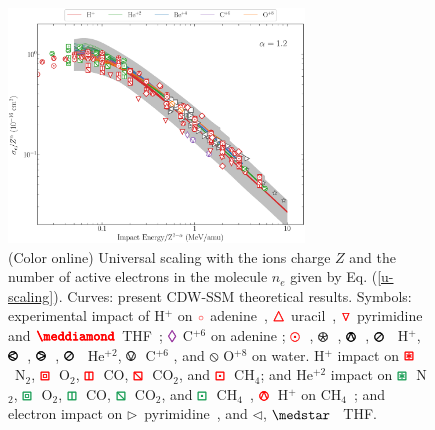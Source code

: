 \documentclass[10pt,showpacs,showkeys,twocolumn]{revtex4}
\begin{document}
\begin{figure}[!t]%
\centering
\includegraphics[width=0.7\textwidth]{zmol_werror.eps}
\caption{(Color online) Universal scaling with the ions charge $Z$ and the number of active electrons in the molecule $n_e$ given by Eq. (\ref{u-scaling}). Curves: present CDW-SSM theoretical results. 
Symbols: experimental impact of H$^+$ on 
\mbox{\LARGE$\color{red}\circ$} adenine~\cite{iriki2011}, 
{\fontsize{11}{20}$\color{red}\pmb{\triangle}$} uracil~\cite{itoh2013}, 
{\fontsize{11}{20}$\color{red}\pmb{\triangledown}$} pyrimidine~\cite{wolff2014} and 
{\fontsize{10}{20}$\color{red}\pmb{\meddiamond}$} THF~\cite{wang2016};
{\fontsize{11}{20}$\color{Purple}\pmb{\lozenge}$} C$^{+6}$ on adenine \cite{tribedi2019};
\mbox{\fontsize{11}{20}$\color{red}\pmb{\odot}$}~\cite{Luna2007}, 
{\fontsize{11}{20}\color{red}$\pmb{\logof}$}~\cite{Rudd86}, 
{\fontsize{11}{20}\color{red}$\pmb{\varowedge}$}~\cite{pRudd85}, 
{\fontsize{11}{20}\color{red}$\pmb{\varoslash}$}~\cite{toburen80} H$^+$,
{\fontsize{11}{20}\color{ForestGreen}$\pmb{\varolessthan}$}~\cite{Ohsawa05},
{\fontsize{11}{20}\color{ForestGreen}$\pmb{\varogreaterthan}$}~\cite{Rudd85},
{\fontsize{11}{20}\color{ForestGreen}$\pmb{\varoslash}$}~\cite{toburen80} He$^{+2}$,
{\fontsize{11}{20}\color{Purple}$\pmb{\ovee}$}~C$^{+6}$ \cite{DalCappello2009,Bhattacharjee17}, and 
{\fontsize{11}{20}\color{BurntOrange}$\pmb{\obslash}$}
O$^{+8}$ \cite{Tribedi_O_water} on water.
H$^{+}$ impact on 
{\fontsize{11}{20}${\color{red}\pmb{\boxast}}$}~N$_2$, 
{\fontsize{11}{20}${\color{red}\pmb{\boxbox}}$}~O$_2$, 
{\fontsize{11}{20}${\color{red}\pmb{\boxbar}}$}~CO, 
{\fontsize{11}{20}${\color{red}\pmb{\boxbslash}}$}~CO$_2$, and
{\fontsize{11}{20}${\color{red}\pmb{\boxdot}}$}~CH$_4$; 
and He$^{+2}$ impact on 
{\fontsize{11}{20}${\color{ForestGreen}\pmb{\boxast}}$}~N$_2$,
{\fontsize{11}{20}${\color{ForestGreen}\pmb{\boxbox}}$}~O$_2$, 
{\fontsize{11}{20}${\color{ForestGreen}\pmb{\boxbar}}$}~CO, 
{\fontsize{11}{20}${\color{ForestGreen}\pmb{\boxbslash}}$}~CO$_2$, and
{\fontsize{11}{20}${\color{ForestGreen}\pmb{\boxdot}}$}~CH$_4$~\cite{Rudd85,Rudd1983}, 
{\fontsize{11}{20}${\color{red}\pmb{\varowedge}}$}~H$^{+}$ on CH$_4$~\cite{Luna2019}; 
and electron impact on $\rhd$~pyrimidine~\cite{bug2017}, and $\lhd$, $\medstar$~\cite{wolf2019,fuss2009} THF.}
\label{fig:zalpha}
\end{figure} 
 
\end{document}
